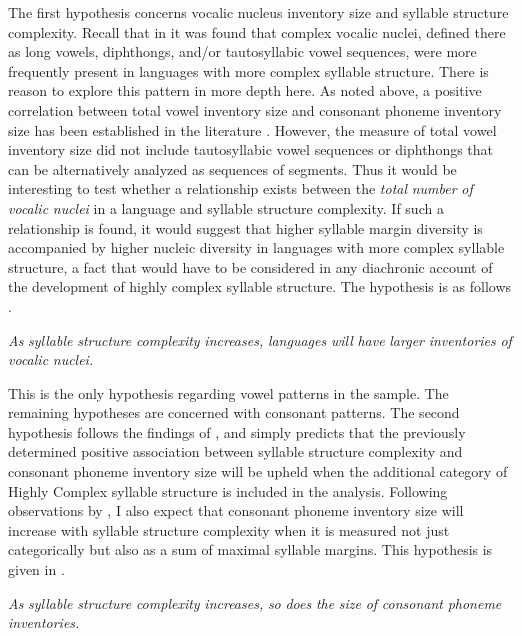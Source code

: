   The first hypothesis concerns vocalic nucleus inventory size and syllable structure complexity. Recall that in  it was found that complex vocalic nuclei, defined there as long vowels, diphthongs, and/or tautosyllabic vowel sequences, were more frequently present in languages with more complex syllable structure. There is reason to explore this pattern in more depth here. As noted above, a positive correlation between total vowel inventory size and consonant phoneme inventory size has been established in the literature \citep{Maddieson2011}. However, the measure of total vowel inventory size did not include tautosyllabic vowel sequences or diphthongs that can be alternatively analyzed as sequences of segments. Thus it would be interesting to test whether a relationship exists between the \textit{total} \textit{number} \textit{of} \textit{vocalic} \textit{nuclei} in a language and syllable structure complexity. If such a relationship is found, it would suggest that higher syllable margin diversity is accompanied by higher nucleic diversity in languages with more complex syllable structure, a fact that would have to be considered in any diachronic account of the development of highly complex syllable structure. The hypothesis is as follows .

\ea\label{ex:(4.2)}
  \textit{As} \textit{syllable} \textit{structure} \textit{complexity} \textit{increases,} \textit{languages} \textit{will} \textit{have} \textit{larger} \textit{inventories} \textit{of} \textit{vocalic} \textit{nuclei.}
\z

  This is the only hypothesis regarding vowel patterns in the sample. The remaining hypotheses are concerned with consonant patterns. The second hypothesis follows the findings of \citet{Maddieson2006}, and simply predicts that the previously determined positive association between syllable structure complexity and consonant phoneme inventory size will be upheld when the additional category of Highly Complex syllable structure is included in the analysis. Following observations by \citet{Gordon2016}, I also expect that consonant phoneme inventory size will increase with syllable structure complexity when it is measured not just categorically but also as a sum of maximal syllable margins. This hypothesis is given in .

\ea\label{ex:(4.3)}
  \textit{As} \textit{syllable} \textit{structure} \textit{complexity} \textit{increases,} \textit{so} \textit{does} \textit{the} \textit{size} \textit{of} \textit{consonant} \textit{phoneme} \textit{inventories.}
\z


